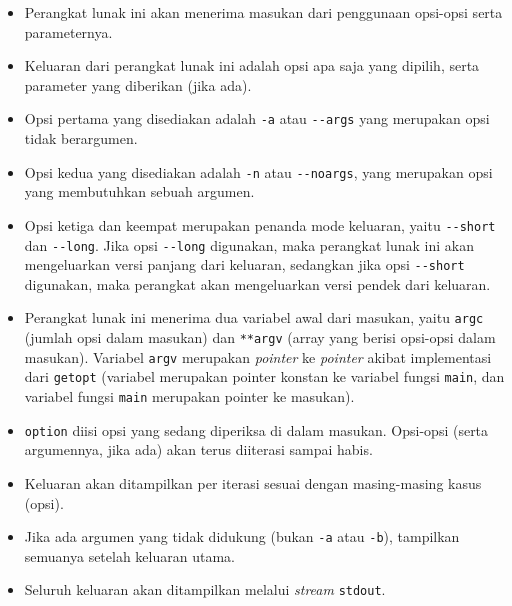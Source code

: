 \begin{itemize}
	\item Perangkat lunak ini akan menerima masukan dari penggunaan opsi-opsi serta parameternya.
	\item Keluaran dari perangkat lunak ini adalah opsi apa saja yang dipilih, serta parameter yang diberikan (jika ada).
	\item Opsi pertama yang disediakan adalah \verb|-a| atau \verb|--args| yang merupakan opsi tidak berargumen.
	\item Opsi kedua yang disediakan adalah \verb|-n| atau \verb|--noargs|, yang merupakan opsi yang membutuhkan sebuah argumen.
	\item Opsi ketiga dan keempat merupakan penanda mode keluaran, yaitu \verb|--short| dan \verb|--long|. Jika opsi \verb|--long| digunakan, maka perangkat lunak ini akan mengeluarkan versi panjang dari keluaran, sedangkan jika opsi \verb|--short| digunakan, maka perangkat akan mengeluarkan versi pendek dari keluaran.
	\item Perangkat lunak ini menerima dua variabel awal dari masukan, yaitu \verb|argc| (jumlah opsi dalam masukan) dan \verb|**argv| (array yang berisi opsi-opsi dalam masukan). Variabel \verb|argv| merupakan \textit{pointer} ke \textit{pointer} akibat implementasi dari \verb|getopt| (variabel merupakan pointer konstan ke variabel fungsi \verb|main|, dan variabel fungsi \verb|main| merupakan pointer ke masukan).
	\item \verb|option| diisi opsi yang sedang diperiksa di dalam masukan. Opsi-opsi (serta argumennya, jika ada) akan terus diiterasi sampai habis.
	\item Keluaran akan ditampilkan per iterasi sesuai dengan masing-masing kasus (opsi).
	\item Jika ada argumen yang tidak didukung (bukan \verb|-a| atau \verb|-b|), tampilkan semuanya setelah keluaran utama.
	\item Seluruh keluaran akan ditampilkan melalui \textit{stream} \verb|stdout|.
\end{itemize}

